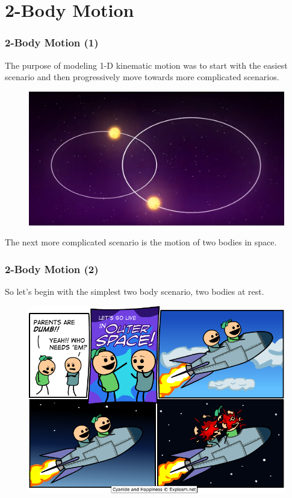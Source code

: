 \documentclass{beamer}
\begin{document}
\section{2-Body Motion}
\begin{frame}
\frametitle{2-Body Motion (1)}
The purpose of modeling 1-D kinematic motion was to start with the easiest scenario and then progressively move towards more complicated scenarios.
\begin{figure}[htbp]
\begin{center}
\includegraphics[width=0.70\linewidth]{BinaryStar.jpg}
\end{center}
\end{figure}
The next more complicated scenario is the motion of two bodies in space.
\end{frame}
\begin{frame}
\frametitle{2-Body Motion (2)}
So let's begin with the simplest two body scenario, two bodies at rest.
\begin{figure}[htbp]
\begin{center}
\includegraphics[width=0.75\linewidth]{SpaceComic.png}
\end{center}
\end{figure}
\end{frame}
\end{document}
